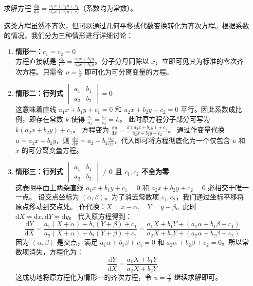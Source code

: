 \documentclass[lang=cn,11pt]{elegantbook}
\begin{document}
\begin{exercise} \label{ex:ode-quasi-homog}
求解方程 $\displaystyle\frac{\mathrm{d}y}{\mathrm{d}x}=\frac{a_1x+b_1y+c_1}{a_2x+b_2y+c_2}$（系数均为常数）。
\end{exercise}
\begin{solution}
这类方程虽然不齐次，但可以通过几何平移或代数变换转化为齐次方程。根据系数的情况，我们分为三种情形进行详细讨论：
\begin{enumerate}
    \item \textbf{情形一：$c_1=c_2=0$}\\
    方程直接就是 $\frac{\mathrm{d}y}{\mathrm{d}x}=\frac{a_1x+b_1y}{a_2x+b_2y}$。分子分母同除以 $x$，立即可见其为标准的零次齐次方程。只需令 $u = \frac{y}{x}$ 即可化为可分离变量的方程。
    
    \item \textbf{情形二：行列式 $\begin{vmatrix}a_1&b_1\\a_2&b_2\end{vmatrix}=0$}\\
    这意味着直线 $a_1x+b_1y+c_1=0$ 和 $a_2x+b_2y+c_2=0$ 平行。因此系数成比例，即存在常数 $k$ 使得 $\frac{a_1}{a_2} = \frac{b_1}{b_2} = k$。
    此时原方程分子部分可写为 $k(a_2x+b_2y)+c_1$。
    方程变为 $\frac{\mathrm{d}y}{\mathrm{d}x} = \frac{k(a_2x+b_2y)+c_1}{a_2x+b_2y+c_2}$。
    通过作变量代换 $u = a_2x+b_2y$，则 $\frac{\mathrm{d}u}{\mathrm{d}x} = a_2 + b_2\frac{\mathrm{d}y}{\mathrm{d}x}$，代入即可将方程彻底化为一个仅包含 $u$ 和 $x$ 的可分离变量方程。
    
    \item \textbf{情形三：行列式 $\begin{vmatrix}a_1&b_1\\a_2&b_2\end{vmatrix}\neq0$ 且 $c_1,c_2$ 不全为零}\\
    这表明平面上两条直线 $a_1x+b_1y+c_1=0$ 和 $a_2x+b_2y+c_2=0$ 必相交于唯一一点。
    设交点坐标为 $(\alpha, \beta)$。为了消去常数项 $c_1, c_2$，我们通过坐标平移将原点移动到交点处。
    作代换：$X = x - \alpha, \quad Y = y - \beta$。此时 $\mathrm{d}X = \mathrm{d}x, \mathrm{d}Y = \mathrm{d}y$。
    代入原方程得到：
    \[
    \frac{\mathrm{d}Y}{\mathrm{d}X} = \frac{a_1(X+\alpha)+b_1(Y+\beta)+c_1}{a_2(X+\alpha)+b_2(Y+\beta)+c_2} = \frac{a_1X+b_1Y + (a_1\alpha+b_1\beta+c_1)}{a_2X+b_2Y + (a_2\alpha+b_2\beta+c_2)}
    \]
    因为 $(\alpha, \beta)$ 是交点，满足 $a_1\alpha+b_1\beta+c_1=0$ 和 $a_2\alpha+b_2\beta+c_2=0$。所以常数项消失，方程化为：
    \[
    \frac{\mathrm{d}Y}{\mathrm{d}X} = \frac{a_1X+b_1Y}{a_2X+b_2Y}
    \]
    这成功地将原方程化为情形一的齐次方程，令 $u = \frac{Y}{X}$ 继续求解即可。
\end{enumerate}
\end{solution}
\end{document}
